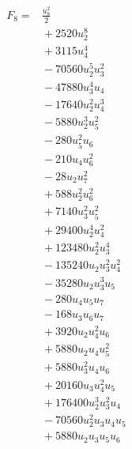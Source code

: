 \begin{align*}
F_{8}={}& \frac{u_{8}^{2}}{2}
\\ &{}+2520 u_{2}^{8}
\\ &{}+3115 u_{4}^{4}
\\ &{}-70560 u_{2}^{5} u_{3}^{2}
\\ &{}-47880 u_{3}^{4} u_{4}
\\ &{}-17640 u_{2}^{2} u_{4}^{3}
\\ &{}-5880 u_{2}^{3} u_{5}^{2}
\\ &{}-280 u_{5}^{2} u_{6}
\\ &{}-210 u_{4} u_{6}^{2}
\\ &{}-28 u_{2} u_{7}^{2}
\\ &{}+588 u_{2}^{2} u_{6}^{2}
\\ &{}+7140 u_{3}^{2} u_{5}^{2}
\\ &{}+29400 u_{2}^{4} u_{4}^{2}
\\ &{}+123480 u_{2}^{2} u_{3}^{4}
\\ &{}-135240 u_{2} u_{3}^{2} u_{4}^{2}
\\ &{}-35280 u_{2} u_{3}^{3} u_{5}
\\ &{}-280 u_{4} u_{5} u_{7}
\\ &{}-168 u_{3} u_{6} u_{7}
\\ &{}+3920 u_{2} u_{4}^{2} u_{6}
\\ &{}+5880 u_{2} u_{4} u_{5}^{2}
\\ &{}+5880 u_{3}^{2} u_{4} u_{6}
\\ &{}+20160 u_{3} u_{4}^{2} u_{5}
\\ &{}+176400 u_{2}^{3} u_{3}^{2} u_{4}
\\ &{}-70560 u_{2}^{2} u_{3} u_{4} u_{5}
\\ &{}+5880 u_{2} u_{3} u_{5} u_{6}
\end{align*}
